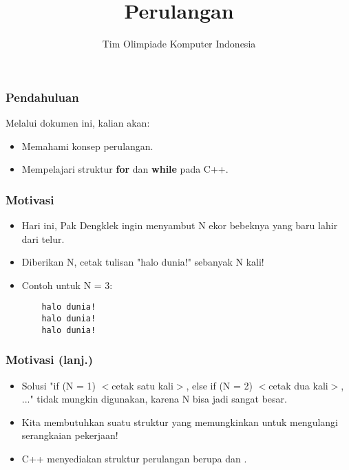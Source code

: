 

\title{Perulangan}
\author{Tim Olimpiade Komputer Indonesia}
\date{}



\begin{frame}
\titlepage
\end{frame}

\begin{frame}
\frametitle{Pendahuluan}
Melalui dokumen ini, kalian akan:
\begin{itemize}
  \item Memahami konsep perulangan.
  \item Mempelajari struktur \textbf{for} dan \textbf{while} pada C++.
\end{itemize}
\end{frame}

\begin{frame}[fragile]
\frametitle{Motivasi}
\begin{itemize}
  \item Hari ini, Pak Dengklek ingin menyambut N ekor bebeknya yang baru lahir dari telur.
  \item Diberikan N, cetak tulisan "halo dunia!" sebanyak N kali!
  \item Contoh untuk N = 3:
  \begin{lstlisting}
    halo dunia!
    halo dunia!
    halo dunia!
  \end{lstlisting}
\end{itemize}
\end{frame}

\begin{frame}
\frametitle{Motivasi (lanj.)}
\begin{itemize}
  \item Solusi "if (N = 1) $<$cetak satu kali$>$, else if (N = 2) $<$cetak dua kali$>$, ..." tidak mungkin digunakan, karena N bisa jadi sangat besar.
  \item Kita membutuhkan suatu struktur yang memungkinkan untuk mengulangi serangkaian pekerjaan!
  \item C++ menyediakan struktur perulangan berupa  dan .
\end{itemize}
\end{frame}



